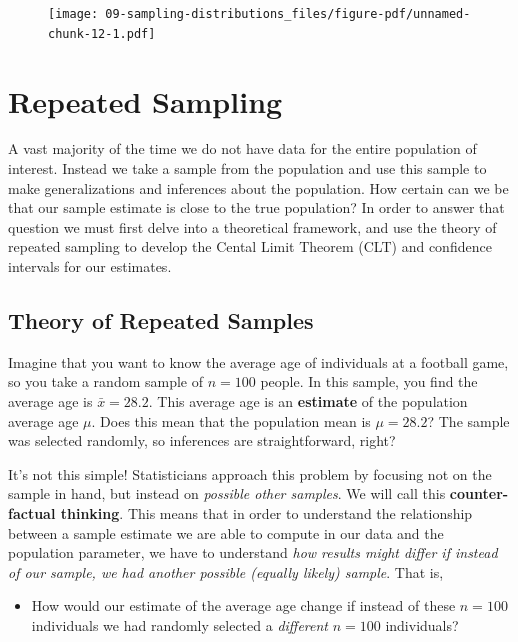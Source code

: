\documentclass[
  letterpaper,
  DIV=11,
  numbers=noendperiod]{scrreprt}
\providecommand{\tightlist}{%
  \setlength{\itemsep}{0pt}\setlength{\parskip}{0pt}}\usepackage{longtable,booktabs,array}
\theoremstyle{definition}
\theoremstyle{remark}
\begin{document}
\begin{figure}

{\centering \texttt{[image: 09-sampling-distributions\_files/figure-pdf/unnamed-chunk-12-1.pdf]}

}

\end{figure}

\hypertarget{sec-repeat-sample}{%
\section{Repeated Sampling}\label{sec-repeat-sample}}

A vast majority of the time we do not have data for the entire
population of interest. Instead we take a sample from the population and
use this sample to make generalizations and inferences about the
population. How certain can we be that our sample estimate is close to
the true population? In order to answer that question we must first
delve into a theoretical framework, and use the theory of repeated
sampling to develop the Cental Limit Theorem (CLT) and confidence
intervals for our estimates.

\hypertarget{sec-theory}{%
\subsection{Theory of Repeated Samples}\label{sec-theory}}

Imagine that you want to know the average age of individuals at a
football game, so you take a random sample of \(n=100\) people. In this
sample, you find the average age is \(\bar{x} = 28.2\). This average age
is an \textbf{estimate} of the population average age \(\mu\). Does this
mean that the population mean is \(\mu = 28.2\)? The sample was selected
randomly, so inferences are straightforward, right?

It's not this simple! Statisticians approach this problem by focusing
not on the sample in hand, but instead on \emph{possible other samples}.
We will call this \textbf{counter-factual thinking}. This means that in
order to understand the relationship between a sample estimate we are
able to compute in our data and the population parameter, we have to
understand \emph{how results might differ if instead of our sample, we
had another possible (equally likely) sample}. That is,

\begin{itemize}
\tightlist
\item
  How would our estimate of the average age change if instead of these
  \(n = 100\) individuals we had randomly selected a \emph{different}
  \(n = 100\) individuals?
\end{itemize}
\end{document}
